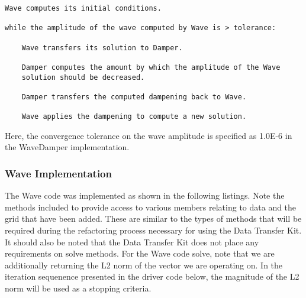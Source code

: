\documentclass[letterpaper]{article}
\begin{document}
\begin{verbatim}
Wave computes its initial conditions.

while the amplitude of the wave computed by Wave is > tolerance:

    Wave transfers its solution to Damper.

    Damper computes the amount by which the amplitude of the Wave
    solution should be decreased.

    Damper transfers the computed dampening back to Wave.

    Wave applies the dampening to compute a new solution.
\end{verbatim}

Here, the convergence tolerance on the wave amplitude is specified as
1.0E-6 in the WaveDamper implementation.

\subsubsection{Wave Implementation}
The Wave code was implemented as shown in the following listings. Note
the methods included to provide access to various members relating to
data and the grid that have been added. These are similar to the types
of methods that will be required during the refactoring process
necessary for using the Data Transfer Kit. It should also be noted
that the Data Transfer Kit does not place any requirements on solve
methods. For the Wave code solve, note that we are additionally
returning the L2 norm of the vector we are operating on. In the
iteration sequenence presented in the driver code below, the magnitude
of the L2 norm will be used as a stopping criteria.
\end{document}
